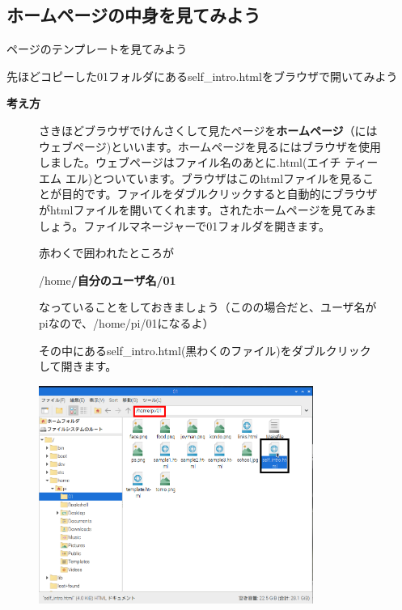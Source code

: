\documentclass[a4paper,12pt]{jarticle}
\begin{document}
\bigskip

\clearpage
{}
\subsection{\theExercise ホームページの中身を見てみよう}
ページのテンプレートを見てみよう

先ほどコピーした01フォルダにあるself\_intro.htmlをブラウザで開いてみよう

\textbf{考え方}



\begin{figure}[hb]
  \centering
  \begin{minipage}{16.576cm}
    さきほどブラウザでけんさくして見たページを\textbf{ホームページ}（にはウェブページ)といいます。ホームページを見るにはブラウザを使用しました。ウェブページはファイル名のあとに.html(エイチ
    ティー エム
    エル)とついています。ブラウザはこのhtmlファイルを見ることが目的です。ファイルをダブルクリックすると自動的にブラウザがhtmlファイルを開いてくれます。されたホームページを見てみましょう。ファイルマネージャーで01フォルダを開きます。

    赤わくで囲われたところが

    /home\textbf{/自分のユーザ名/01}

    なっていることをしておきましょう（このの場合だと、ユーザ名がpiなので、/home/pi/01になるよ）

    その中にあるself\_intro.html(黒わくのファイル)をダブルクリックして開きます。




    \bigskip
  \end{minipage}

  \includegraphics[width=0.8\textwidth]{textbook-img141.png}

\end{figure}
\end{document}
